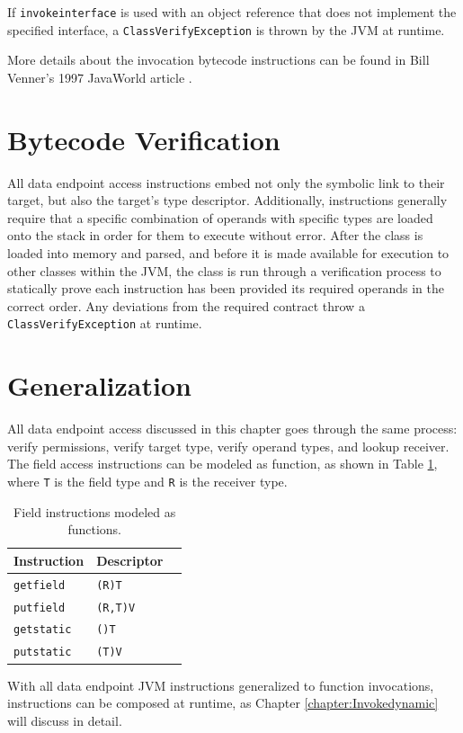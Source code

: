 If \texttt{invokeinterface} is used with an object reference that does not implement the specified interface, a \texttt{ClassVerifyException} is thrown by the JVM at runtime.

More details about the invocation bytecode instructions can be found in Bill Venner's 1997 JavaWorld article \cite{venners-invocation}.

\section{Bytecode Verification}

All data endpoint access instructions embed not only the symbolic link to their target, but also the target's type descriptor.  Additionally, instructions generally require that a specific combination of operands with specific types are loaded onto the stack in order for them to execute without error.  After the class is loaded into memory and parsed, and before it is made available for execution to other classes within the JVM, the class is run through a verification process to statically prove each instruction has been provided its required operands in the correct order.  Any deviations from the required contract throw a \texttt{ClassVerifyException} at runtime.

\section{Generalization}

All data endpoint access discussed in this chapter goes through the same process: verify permissions, verify target type, verify operand types, and lookup receiver.  The field access instructions can be modeled as function, as shown in Table \ref{table:field-instruction-descriptors}, where \texttt{T} is the field type and \texttt{R} is the receiver type.

\begin{table}[htbp]
  \centering
  \begin{tabular}{ | l | l | p{5cm} |}
  \hline
  \textbf{Instruction} & \textbf{Descriptor} \\ \hline
  \texttt{getfield} & \texttt{(R)T} \\ \hline
  \texttt{putfield} & \texttt{(R,T)V} \\ \hline
  \texttt{getstatic} & \texttt{()T} \\ \hline
  \texttt{putstatic} & \texttt{(T)V} \\ \hline
  \end{tabular}
  \caption[Field Instruction Descriptors]{Field instructions modeled as functions.}
  \label{table:field-instruction-descriptors}
\end{table}

With all data endpoint JVM instructions generalized to function invocations, instructions can be composed at runtime, as Chapter \ref{chapter:Invokedynamic} will discuss in detail.





